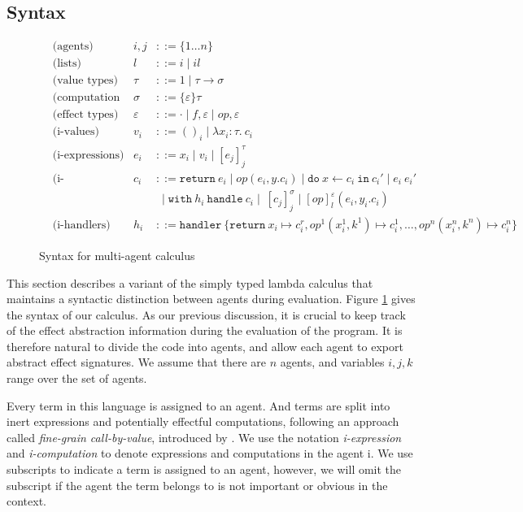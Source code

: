 \subsection{Syntax}
\begin{figure}
\begin{align*}
&\text{(agents)} &i, j &::= \{1 \dots n\}\\
&\text{(lists)} & l &::= i \mid il\\
&\text{(value types)} &\tau &::= 1 \mid \tau \rightarrow \sigma\\
&\text{(computation\ types)} &\sigma &::= \{\varepsilon\}\tau\\
&\text{(effect types)} &\varepsilon &::= \cdot \mid f, \varepsilon \mid op, \varepsilon\\
&\text{(i-values)} &{v_i} &::= ()_i \mid \lambda x_i:\tau.\ c_i\\
&\text{(i-expressions)} &e_i &::= x_i \mid v_i \mid [e_j]^\tau_j \\
& \text{(i-computations)} &c_i &::= \texttt{return}\ e_i \mid op(e_i, y.c_i) \mid \texttt{do}\ x \leftarrow c_i\ \texttt{in}\ c_i' \mid e_i\ e_i'\\
 &\ &\ &\  \mid \texttt{with}\ h_i\ \texttt{handle}\ c_i \mid\ [c_j]^\sigma_j \mid [op]^\varepsilon_l (e_i, y_i.c_i)\\
&\text{(i-handlers)} &h_i &::= \texttt{handler}\ \{\texttt{return}\ x_i \mapsto c^r_i, op^1(x_i^1, k^1) \mapsto c_i^1, \dots ,  op^n(x_i^n, k^n) \mapsto c_i^n\}  
\end{align*}
\caption{Syntax for multi-agent calculus}
\label{fig-core}
\end{figure}

This section describes a variant of the simply typed lambda calculus that maintains a syntactic distinction between agents during evaluation. Figure \ref{fig-core} gives the syntax of our calculus. As our previous discussion, it is crucial to keep track of the effect abstraction information during the evaluation of the program. It is therefore natural to divide the code into agents, and allow each agent to export abstract effect signatures. We assume that there are $n$ agents, and variables $i, j, k$ range over the set of agents. 

Every term in this language is assigned to an agent. And terms are split into inert expressions and potentially effectful computations, following an approach called \emph{fine-grain call-by-value}, introduced by \citet{levy03}. We use the notation \emph{i-expression} and \emph{i-computation} to denote expressions and computations in the agent i. We use subscripts to indicate a term is assigned to an agent, however, we will omit the subscript if the agent the term belongs to is not important or obvious in the context.


